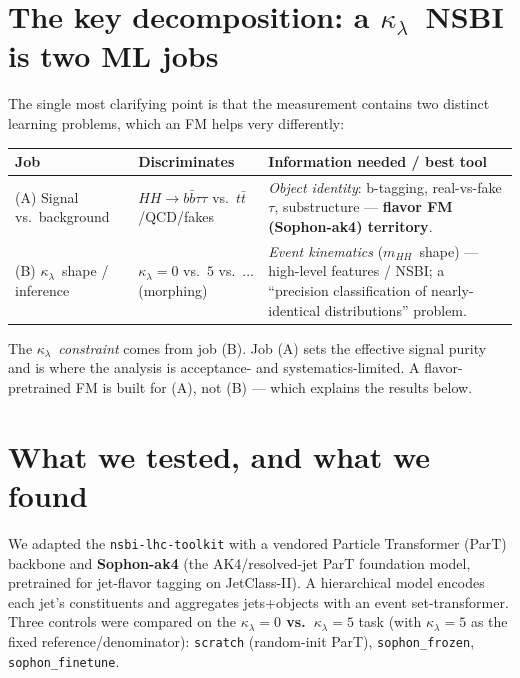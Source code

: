 \documentclass[11pt]{article}
\newcommand{\kl}{\ensuremath{\kappa_\lambda}}
\newcommand{\mhh}{\ensuremath{m_{HH}}}
\newcommand{\bbtt}{\ensuremath{b\bar b\tau\tau}}
\begin{document}
\section{The key decomposition: a \kl\ NSBI is two ML jobs}
The single most clarifying point is that the measurement contains two distinct
learning problems, which an FM helps very differently:

\begin{table}[h]
\centering\small
\begin{tabular}{@{}p{}p{}p{}@{}}
\toprule
\textbf{Job} & \textbf{Discriminates} & \textbf{Information needed / best tool} \\
\midrule
(A) Signal vs.\ background & $HH\to\bbtt$ vs.\ $t\bar t$/QCD/fakes &
\emph{Object identity}: b-tagging, real-vs-fake $\tau$, substructure ---
\textbf{flavor FM (Sophon-ak4) territory}. \\
\addlinespace
(B) \kl\ shape / inference & $\kl=0$ vs.\ $5$ vs.\ $\dots$ (morphing) &
\emph{Event kinematics} (\mhh\ shape) --- high-level features / NSBI; a
``precision classification of nearly-identical distributions'' problem. \\
\bottomrule
\end{tabular}
\end{table}

\noindent The \kl\ \emph{constraint} comes from job (B). Job (A) sets the effective
signal purity and is where the analysis is acceptance- and systematics-limited.
A flavor-pretrained FM is built for (A), not (B) --- which explains the results below.

\section{What we tested, and what we found}
We adapted the \texttt{nsbi-lhc-toolkit} with a vendored Particle Transformer
(ParT) backbone and \textbf{Sophon-ak4} (the AK4/resolved-jet ParT foundation model,
pretrained for jet-flavor tagging on JetClass-II). A hierarchical model encodes each
jet's constituents and aggregates jets+objects with an event set-transformer.
Three controls were compared on the \textbf{$\kl{=}0$ vs.\ $\kl{=}5$} task
(with $\kl{=}5$ as the fixed reference/denominator):
\texttt{scratch} (random-init ParT), \texttt{sophon\_frozen}, \texttt{sophon\_finetune}.
\end{document}
